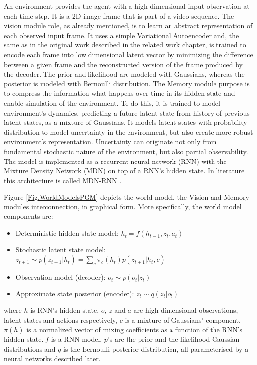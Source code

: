 An environment provides the agent with a high dimensional input observation at each time step. It is a 2D image frame that is part of a video sequence. The vision module role, as already mentioned, is to learn an abstract representation of each observed input frame. It uses a simple Variational Autoencoder \cite{Algo.VAE} and, the same as in the original work described in the related work chapter, is trained to encode each frame into low dimensional latent vector by minimizing the difference between a given frame and the reconstructed version of the frame produced by the decoder. The prior and likelihood are modeled with Gaussians, whereas the posterior is modeled with Bernoulli distribution. 
The Memory module purpose is to compress the information what happens over time in its hidden state and enable simulation of the environment. To do this, it is trained to model environment's dynamics, predicting a future latent state from history of previous latent states, as a mixture of Gaussians. It models latent states with probability distribution to model uncertainty in the environment, but also create more robust environment's representation. Uncertainty can originate not only from fundamental stochastic nature of the environment, but also partial observability. The model is implemented as a recurrent neural network (RNN) with the Mixture Density Network (MDN) on top of a RNN's hidden state. In literature this architecture is called MDN-RNN \cite{Algo.MDNRNN}.

Figure \ref{Fig.WorldModelsPGM} depicts the world model, the Vision and Memory modules interconnection, in graphical form. More specifically, the world model components are:
\begin{itemize}
\item Deterministic hidden state model:      $h_t = f(h_{t-1}, z_{t}, a_{t})$
\item Stochastic latent state model:         $z_{t+1} \sim p(z_{t+1}|h_t) = \sum_c\pi_c(h_t)p(z_{t+1}|h_t, c)$
\item Observation model (decoder):           $o_t \sim p(o_t|z_t)$
\item Approximate state posterior (encoder): $z_t \sim q(z_t|o_t)$
\end{itemize}
where $h$ is RNN's hidden state, $o$, $z$ and $a$ are high-dimensional observations, latent states and actions respectively, $c$ is a mixture of Gaussians' component, $\pi(h)$ is a normalized vector of mixing coefficients as a function of the RNN's hidden state. $f$ is a RNN model, $p$'s are the prior and the likelihood Gaussian distributions and $q$ is the Bernoulli posterior distribution, all parameterised by a neural networks described later.

